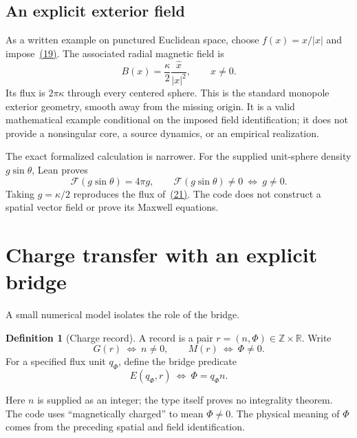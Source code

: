 \documentclass[11pt]{article}
\theoremstyle{definition}\newtheorem{definition}[theorem]{Definition}
\theoremstyle{remark}\newtheorem{remark}[theorem]{Remark}
\newcommand{\R}{\mathbb{R}}
\newcommand{\Z}{\mathbb{Z}}
\begin{document}
\subsection{An explicit exterior field}
As a written example on punctured Euclidean space, choose $f(x)=x/|x|$ and impose~\hyperref[eq:physicalbridge]{(19)}. The associated radial magnetic field is
\hypertarget{eq:radial}{}
\begin{equation}
 B(x)=\frac{\kappa}{2}\frac{\widehat x}{|x|^2},\qquad x\neq0.
\end{equation}
Its flux is $2\pi\kappa$ through every centered sphere. This is the standard monopole exterior geometry, smooth away from the missing origin. It is a valid mathematical example conditional on the imposed field identification; it does not provide a nonsingular core, a source dynamics, or an empirical realization.

The exact formalized calculation is narrower. For the supplied unit-sphere density $g\sin\theta$, Lean proves
\hypertarget{eq:radialflux}{}
\begin{equation}
 \mathcal F(g\sin\theta)=4\pi g,\qquad
 \mathcal F(g\sin\theta)\neq0\ \Longleftrightarrow\ g\neq0.
\end{equation}
Taking $g=\kappa/2$ reproduces the flux of~\hyperref[eq:radial]{(21)}. The code does not construct a spatial vector field or prove its Maxwell equations.

\section{Charge transfer with an explicit bridge}
A small numerical model isolates the role of the bridge.
\begin{definition}[Charge record]\label{def:record}
A record is a pair $r=(n,\Phi)\in\Z\times\R$. Write
\[
 G(r)\ \Longleftrightarrow\ n\neq0,\qquad
 M(r)\ \Longleftrightarrow\ \Phi\neq0.
\]
For a specified flux unit $q_\Phi$, define the bridge predicate
\hypertarget{eq:recordbridge}{}
\begin{equation}
 E(q_\Phi,r)\ \Longleftrightarrow\ \Phi=q_\Phi n.
\end{equation}
\end{definition}
Here $n$ is supplied as an integer; the type itself proves no integrality theorem. The code uses ``magnetically charged'' to mean $\Phi\neq0$. The physical meaning of $\Phi$ comes from the preceding spatial and field identification.
\end{document}
